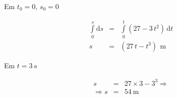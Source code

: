 \documentclass[12pt]{beamer}
\begin{document}
\begin{frame}
	Em $t_{0}=0$, $s_{0}=0$
	
	\begin{eqnarray}
		\int\limits_{0}^{s}\text{d}s&=&\int\limits_{0}^{t}(27-3\,t^{2})\,\text{d}t\\
		s&=&(27\,t-t^{3})\,\SI{}{\meter}
	\end{eqnarray}

	Em $t=\SI{3}{\second}$
	
	\begin{eqnarray}
		s&=&27\times 3-3^{3} \Rightarrow\\
		\Rightarrow s&=&\SI{54}{\meter}
	\end{eqnarray}
\end{frame}
\end{document}
